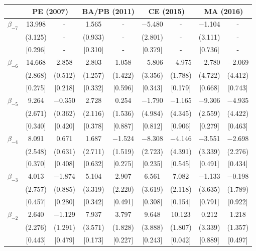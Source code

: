 \documentclass[12pt]{article}
\begin{document}
\begin{table}[h!]
\centering
\label{tab:event_study_completa}
\begin{adjustbox}{max width=\textwidth, scale=0.8}
\begin{tabular}{ccccccccc}
\toprule
& \multicolumn{2}{c}{PE (2007)} & \multicolumn{2}{c}{BA/PB (2011)} & \multicolumn{2}{c}{CE (2015)} & \multicolumn{2}{c}{MA (2016)} \\
\midrule
$\beta_{-7}$ & 13.998 & - & 1.565 & - & $-$5.480 & - & $-$1.104 & - \\
& (3.125) & - & (0.933) & - & (2.801) & - & (3.111) & - \\
& [0.296] & - & [0.310] & - & [0.379] & - & [0.736] & - \\
$\beta_{-6}$ & 14.668 & 2.858 & 2.803 & 1.058 & $-$5.806 & $-$4.975 & $-$2.780 & $-$2.069 \\
& (2.868) & (0.512) & (1.257) & (1.422) & (3.356) & (1.788) & (4.722) & (4.412) \\
& [0.275] & [0.218] & [0.332] & [0.596] & [0.343] & [0.179] & [0.668] & [0.743] \\
$\beta_{-5}$ & 9.264 & $-$0.350 & 2.728 & 0.254 & $-$1.790 & $-$1.165 & $-$9.306 & $-$4.935 \\
& (2.671) & (0.362) & (2.116) & (1.536) & (4.984) & (4.345) & (2.559) & (4.422) \\
& [0.340] & [0.420] & [0.378] & [0.887] & [0.812] & [0.906] & [0.279] & [0.463] \\
$\beta_{-4}$ & 8.091 & 0.671 & 1.687 & $-$1.524 & $-$8.308 & $-$4.146 & $-$3.551 & $-$2.698 \\
& (2.548) & (0.631) & (2.711) & (1.519) & (2.723) & (4.391) & (3.339) & (2.276) \\
& [0.370] & [0.408] & [0.632] & [0.275] & [0.235] & [0.545] & [0.491] & [0.434] \\
$\beta_{-3}$ & 4.013 & $-$1.874 & 5.104 & 2.907 & 6.561 & 7.082 & $-$1.133 & $-$0.198 \\
& (2.757) & (0.885) & (3.319) & (2.220) & (3.619) & (2.118) & (3.635) & (1.789) \\
& [0.457] & [0.280] & [0.342] & [0.491] & [0.308] & [0.154] & [0.791] & [0.922] \\
$\beta_{-2}$ & 2.640 & $-$1.129 & 7.937 & 3.797 & 9.648 & 10.123 & 0.212 & 1.218 \\
& (2.276) & (1.291) & (3.571) & (1.828) & (3.888) & (1.807) & (3.339) & (1.357) \\
& [0.443] & [0.479] & [0.173] & [0.227] & [0.243] & [0.042] & [0.889] & [0.497] \\

\end{tabular}
\end{adjustbox}
\end{table}
\end{document}
